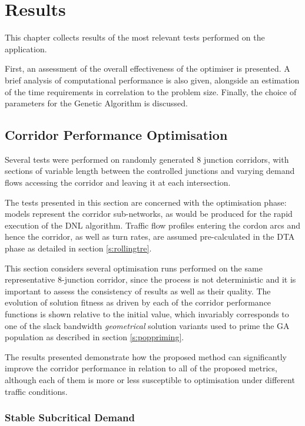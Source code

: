 
\chapter{Results} \label{c:results}

This chapter collects results of the most relevant tests performed on the application. 

First, an assessment of the overall effectiveness of the optimiser is presented. A brief analysis of computational performance is also given, alongside an estimation of the time requirements in correlation to the problem size. Finally, the choice of parameters for the Genetic Algorithm is discussed.

\section{Corridor Performance Optimisation} \label{r:kpi}
Several tests were performed on randomly generated 8 junction corridors, with sections of variable length between the controlled junctions and varying demand flows accessing the corridor and leaving it at each intersection.

The tests presented in this section are concerned with the optimisation phase: models represent the corridor sub-networks, as would be produced for the rapid execution of the DNL algorithm. Traffic flow profiles entering the cordon arcs and hence the corridor, as well as turn rates, are assumed pre-calculated in the DTA phase as detailed in section \ref{s:rollingtre}.

This section considers several optimisation runs performed on the same representative 8-junction corridor, since the process is not deterministic and it is important to assess the consistency of results as well as their quality. The evolution of solution fitness as driven by each of the corridor performance functions is shown relative to the initial value, which invariably corresponds to one of the slack bandwidth \emph{geometrical} solution variants used to prime the GA population as described in section \ref{s:poppriming}.

The results presented demonstrate how the proposed method can significantly improve the corridor performance in relation to all of the proposed metrics, although each of them is more or less susceptible to optimisation under different traffic conditions.

\pagebreak
\subsection{Stable Subcritical Demand}


